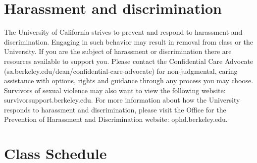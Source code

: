 \documentclass[letterpaper]{inzane_syllabus} %
\begin{document}
\vspace{0.5cm}
\section{Harassment and discrimination}

The University of California strives to prevent and respond to harassment and discrimination. Engaging in such behavior may result in removal from class or the University. If you are the subject of harassment or discrimination there are resources available to support you. Please contact the Confidential Care Advocate (sa.berkeley.edu/dean/confidential-care-advocate) for non-judgmental, caring assistance with options, rights and guidance through any process you may choose. Survivors of sexual violence may also want to view the following website: survivorsupport.berkeley.edu.
For more information about how the University responds to harassment and discrimination, please visit the Office for the Prevention of Harassment and Discrimination website: ophd.berkeley.edu.\\

\newpage
\makeFullPage
\section{Class Schedule}
\end{document}
